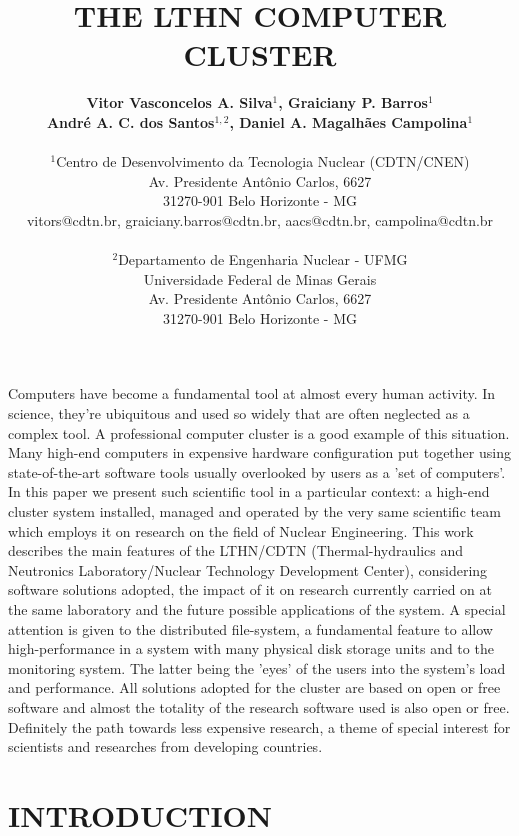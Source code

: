 \documentclass[twoside,a4paper,12pt,english]{inac19}
\title{THE LTHN COMPUTER CLUSTER}
\author
  {{\bfseries{\normalsize Vitor Vasconcelos A. Silva$^{1}$, Graiciany P. Barros$^{1}$}} \\
  {\bfseries{\normalsize {Andr\'e A. C. dos Santos$^{1,2}$, Daniel A. Magalh\~aes Campolina$^{1}$}}} \\ \\
    $^{1}$Centro de Desenvolvimento da Tecnologia Nuclear (CDTN/CNEN)\\
    Av. Presidente Ant\^onio Carlos, 6627 \\
    31270-901 Belo Horizonte - MG\\
    vitors@cdtn.br, graiciany.barros@cdtn.br, aacs@cdtn.br, campolina@cdtn.br\\ \\
    $^{2}$Departamento de Engenharia Nuclear - UFMG \\
    Universidade Federal de Minas Gerais\\
    Av. Presidente Ant\^onio Carlos, 6627 \\
    31270-901 Belo Horizonte - MG\\
    }
\begin{document}
\maketitle



\pagestyle{myheadings}
\thispagestyle{empty}
\markboth{}{}


\thispagestyle{empty}

\begin{abstract_full_paper}
Computers have become a fundamental tool at almost every human activity.
In science, they're ubiquitous and used so widely that are often neglected
as a complex tool. A professional computer cluster is a good example of
this situation. Many high-end computers in expensive hardware configuration
put together using state-of-the-art software tools usually overlooked by
users as a 'set of computers'. In this paper we present such scientific tool
in a particular context: a high-end cluster system installed, managed and operated
by the very same scientific team which employs it on research on the field of Nuclear Engineering.
This work describes the main features of the LTHN/CDTN (Thermal-hydraulics and Neutronics
Laboratory/Nuclear Technology Development Center), considering software solutions
adopted, the impact of it on research currently carried on at the same laboratory
and the future possible applications of the system. A special attention is given to
the distributed file-system, a fundamental feature to allow high-performance in a system
with many physical disk storage units and to the monitoring system. The latter being
the 'eyes' of the users into the system's load and performance. All solutions adopted for the
cluster are based on open or free software and almost the totality of the research
software used is also open or free. Definitely the path towards less expensive
research, a theme of special interest for scientists and researches from developing countries.
\end{abstract_full_paper}

\section{INTRODUCTION}\label{int}
\end{document}
